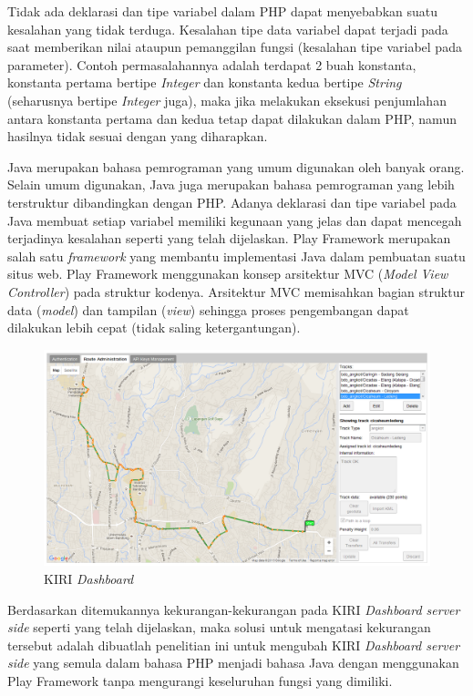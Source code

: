 Tidak ada deklarasi dan tipe variabel dalam PHP dapat menyebabkan suatu kesalahan yang tidak terduga. Kesalahan tipe data variabel dapat terjadi pada saat memberikan nilai ataupun pemanggilan fungsi (kesalahan tipe variabel pada parameter). Contoh permasalahannya adalah terdapat 2 buah konstanta, konstanta pertama bertipe \textit{Integer} dan konstanta kedua bertipe \textit{String} (seharusnya bertipe \textit{Integer} juga), maka jika melakukan eksekusi penjumlahan antara konstanta pertama dan kedua tetap dapat dilakukan dalam PHP, namun hasilnya tidak sesuai dengan yang diharapkan.

Java merupakan bahasa pemrograman yang umum digunakan oleh banyak orang. Selain umum digunakan, Java juga merupakan bahasa pemrograman yang lebih terstruktur dibandingkan dengan PHP. Adanya deklarasi dan tipe variabel pada Java membuat setiap variabel memiliki kegunaan yang jelas dan dapat mencegah terjadinya kesalahan seperti yang telah dijelaskan. Play Framework merupakan salah satu \textit{framework} yang membantu implementasi Java dalam pembuatan suatu situs web. Play Framework menggunakan konsep arsitektur MVC (\textit{Model View Controller})\cite{playforjava} pada struktur kodenya. Arsitektur MVC memisahkan bagian struktur data (\textit{model}) dan tampilan (\textit{view}) sehingga proses pengembangan dapat dilakukan lebih cepat (tidak saling ketergantungan).

\begin{figure}[htbp]
	\centering
		\includegraphics[scale=0.35]{Gambar/1_kiridashboard.png}
	\caption{KIRI \textit{Dashboard}\cite{devkiritravel}}
	\label{fig:1_kiridashboard}
\end{figure}

Berdasarkan ditemukannya kekurangan-kekurangan pada KIRI \textit{Dashboard server side} seperti yang telah dijelaskan, maka solusi untuk mengatasi kekurangan tersebut adalah dibuatlah penelitian ini untuk mengubah KIRI \textit{Dashboard server side} yang semula dalam bahasa PHP menjadi bahasa Java dengan menggunakan Play Framework tanpa mengurangi keseluruhan fungsi yang dimiliki.

